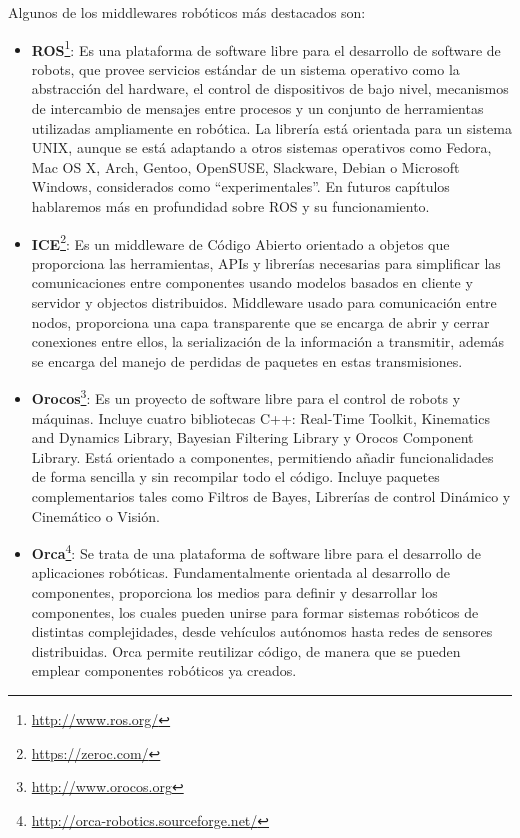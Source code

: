 Algunos de los middlewares robóticos más destacados son:

\begin{itemize}
\item \textbf{ROS}\footnote{\url{http://www.ros.org/}}: Es una plataforma de software libre para el desarrollo de software de robots, que provee servicios estándar de un sistema operativo como la abstracción del hardware, el control de dispositivos de bajo nivel, mecanismos de intercambio de mensajes entre procesos y un conjunto de herramientas utilizadas ampliamente en robótica. La librería está orientada para un sistema UNIX, aunque se está adaptando a otros sistemas operativos como Fedora, Mac OS X, Arch, Gentoo, OpenSUSE, Slackware, Debian o Microsoft Windows, considerados como ``experimentales''.
En futuros capítulos hablaremos más en profundidad sobre ROS y su funcionamiento.

\item \textbf{ICE}\footnote{\url{https://zeroc.com/}}: Es un middleware de Código Abierto orientado a objetos que proporciona las herramientas, APIs y librerías necesarias para simplificar las comunicaciones entre componentes usando modelos basados en cliente y servidor y objectos distribuidos. Middleware usado para comunicación entre nodos, proporciona una capa transparente que se encarga de abrir y cerrar conexiones entre ellos, la serialización de la información a transmitir, además se encarga del manejo de perdidas de paquetes en estas transmisiones.

\item \textbf{Orocos}\footnote{\url{http://www.orocos.org}}: Es un proyecto de software libre para el control de robots y máquinas. Incluye cuatro bibliotecas C++: Real-Time Toolkit, Kinematics and Dynamics Library,  Bayesian Filtering Library y  Orocos Component Library. Está orientado a componentes, permitiendo añadir funcionalidades de forma sencilla y sin recompilar todo el código.  Incluye paquetes complementarios tales como Filtros de Bayes, Librerías de control Dinámico y Cinemático o Visión.

\item \textbf{Orca}\footnote{\url{http://orca-robotics.sourceforge.net/}}: Se trata de una plataforma de software libre para el desarrollo de aplicaciones robóticas. Fundamentalmente orientada al desarrollo de componentes, proporciona los medios para definir y desarrollar los componentes, los cuales pueden unirse para formar sistemas robóticos de distintas complejidades, desde vehículos autónomos hasta redes de sensores distribuidas.
Orca permite reutilizar código, de manera que se pueden emplear componentes robóticos ya creados.
\end{itemize}

